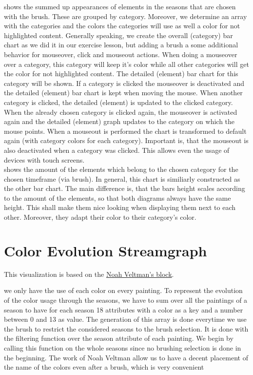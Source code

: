 \documentclass[a4paper]{tufte-book}
\begin{document}
 shows the summed up appearances of elements in the seasons that are chosen with the brush. These are grouped by category. Moreover, we determine an array with the categories and the colors the categories will use as well a color for not highlighted content. Generally speaking, we create the overall (category) bar chart as we did it in our exercise lesson, but adding a brush a some additional behavior for mouseover, click and mouseout actions. When doing a mouseover over a category, this category will keep it's color while all other categories will get the color for not highlighted content. The detailed (element) bar chart for this category will be shown.
If a category is clicked the mouseover is deactivated and the detailed (element) bar chart is kept when moving the mouse. When another category is clicked, the detailed (element) is updated to the clicked category. When the already chosen category is clicked again, the mouseover is activated again and the detailed (element) graph updates to the category on which the mouse points. When a mouseout is performed the chart is transformed to default again (with category colors for each category). Important is, that the mouseout is also deactivated when a category was clicked. This allows even the usage of devices with touch screens. \\

 shows the amount of the elements which belong to the chosen category for the chosen timeframe (via brush). In general, this chart is similiarly constructed as the other bar chart. The main difference is, that the bars height scales according to the amount of the elements, so that both diagrams always have the same height. This shall make them nice looking when displaying them next to each other. Moreover, they adapt their color to their category's color. \\

\section{Color Evolution Streamgraph}

This visualization is based on the \href{https://bl.ocks.org/veltman/14006cc042f5dff5a6e1ddf041afbae6}{Noah Veltman's block}.

 we only have the use of each color on every painting. To represent the evolution of the color usage through the seasons, we have to sum over all the paintings of a season to have for each season 18 attributes with a color as a key and a number between 0 and 13 as value.
The generation of this array is done everytime we use the brush to restrict the considered seasons to the brush selection. It is done with the filtering function over the season attribute of each painting. We begin by calling this function on the whole seasons since no brushing selection is done in the beginning.
The work of Noah Veltman allow us to have a decent placement of the name of the colors even after a brush, which is very convenient
\end{document}
